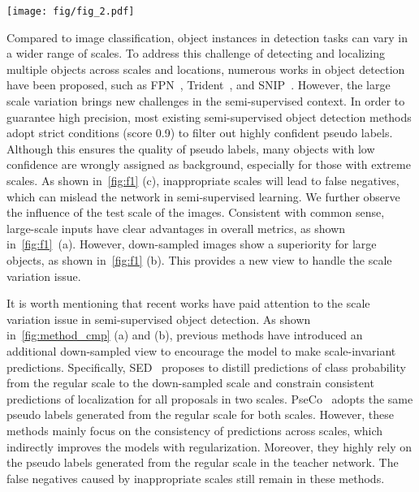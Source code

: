 \documentclass[10pt,twocolumn,letterpaper]{article}
\begin{document}
\begin{figure*}[t]
	\centering
	\texttt{[image: fig/fig\_2.pdf]}
    \vspace{0em}
	\caption{Comparison of multi-scale learning in semi-supervised object detection methods. Previous methods~\cite{sed, pseco} only focus on encouraging consistent predictions for the input image with different scales. The proposed MixTeacher explicitly introduces a mixed scale feature pyramid to adaptive fuse features from appropriate scales, which is capable to detect objects with varying sizes. The mixed scale features generate more accurate pseudo labels and help to mine promising labels, as a plug-in which can be discarded after training.}
	\vspace{-0.8em}
	\label{fig:method_cmp}
\end{figure*}

Compared to image classification, object instances in detection tasks can vary in a wider range of scales. To address this challenge of detecting and localizing multiple objects across scales and locations, numerous works in object detection have been proposed, such as FPN~\cite{fpn}, Trident~\cite{trident}, and SNIP~\cite{snip}. However, the large scale variation brings new challenges in the semi-supervised context. In order to guarantee high precision, most existing semi-supervised object detection methods adopt strict conditions (\eg score  0.9) to filter out highly confident pseudo labels. Although this ensures the quality of pseudo labels, many objects with low confidence are wrongly assigned as background, especially for those with extreme scales. As shown in~\cref{fig:f1} (c), inappropriate scales will lead to false negatives, which can mislead the network in semi-supervised learning.
We further observe the influence of the test scale of the images. Consistent with common sense, large-scale inputs have clear advantages in overall metrics, as shown in~\cref{fig:f1}~(a). However, down-sampled images show a superiority for large objects, as shown in~\cref{fig:f1} (b). This provides a new view to handle the scale variation issue.

It is worth mentioning that recent works have paid attention to the scale variation issue in semi-supervised object detection. As shown in~\cref{fig:method_cmp} (a) and (b), previous methods have introduced an additional down-sampled view to encourage the model to make scale-invariant predictions. Specifically, SED~\cite{sed} proposes to distill predictions of class probability from the regular scale to the down-sampled scale and constrain consistent predictions of localization for all proposals in two scales. PseCo~\cite{pseco} adopts the same pseudo labels generated from the regular scale for both scales. However, these methods mainly focus on the consistency of predictions across scales, which indirectly improves the models with regularization. Moreover, they highly rely on the pseudo labels generated from the regular scale in the teacher network. The false negatives caused by inappropriate scales still remain in these methods.
\end{document}
